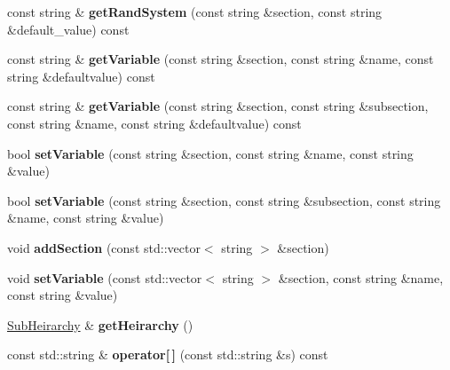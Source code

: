 \begin{DoxyCompactItemize}
\item 
const string \& {\bfseries get\+Rand\+System} (const string \&section, const string \&default\+\_\+value) const \hypertarget{classGalaxyXML_1_1SGalaxy_a46191adbdb5bd25e80ecada9996967a2}{}\label{classGalaxyXML_1_1SGalaxy_a46191adbdb5bd25e80ecada9996967a2}

\item 
const string \& {\bfseries get\+Variable} (const string \&section, const string \&name, const string \&defaultvalue) const \hypertarget{classGalaxyXML_1_1SGalaxy_a654c5e2c492b29ec14e2c91b8d5f7ea6}{}\label{classGalaxyXML_1_1SGalaxy_a654c5e2c492b29ec14e2c91b8d5f7ea6}

\item 
const string \& {\bfseries get\+Variable} (const string \&section, const string \&subsection, const string \&name, const string \&defaultvalue) const \hypertarget{classGalaxyXML_1_1SGalaxy_adbf884cb28a2acae56ecd340ddad8e51}{}\label{classGalaxyXML_1_1SGalaxy_adbf884cb28a2acae56ecd340ddad8e51}

\item 
bool {\bfseries set\+Variable} (const string \&section, const string \&name, const string \&value)\hypertarget{classGalaxyXML_1_1SGalaxy_a1f8b42597f2ae4363a9a4847ea8c7569}{}\label{classGalaxyXML_1_1SGalaxy_a1f8b42597f2ae4363a9a4847ea8c7569}

\item 
bool {\bfseries set\+Variable} (const string \&section, const string \&subsection, const string \&name, const string \&value)\hypertarget{classGalaxyXML_1_1SGalaxy_a9360392564b3f644747f8dc722ecf74a}{}\label{classGalaxyXML_1_1SGalaxy_a9360392564b3f644747f8dc722ecf74a}

\item 
void {\bfseries add\+Section} (const std\+::vector$<$ string $>$ \&section)\hypertarget{classGalaxyXML_1_1SGalaxy_a2c39436467d294d95bca1e70698bb2e7}{}\label{classGalaxyXML_1_1SGalaxy_a2c39436467d294d95bca1e70698bb2e7}

\item 
void {\bfseries set\+Variable} (const std\+::vector$<$ string $>$ \&section, const string \&name, const string \&value)\hypertarget{classGalaxyXML_1_1SGalaxy_ae00847c017232569775323f313443da9}{}\label{classGalaxyXML_1_1SGalaxy_ae00847c017232569775323f313443da9}

\item 
\hyperlink{classGalaxyXML_1_1SubHeirarchy}{Sub\+Heirarchy} \& {\bfseries get\+Heirarchy} ()\hypertarget{classGalaxyXML_1_1SGalaxy_a7ce6a5767fb6932fb4e3082b2f93b9a2}{}\label{classGalaxyXML_1_1SGalaxy_a7ce6a5767fb6932fb4e3082b2f93b9a2}

\item 
const std\+::string \& {\bfseries operator\mbox{[}$\,$\mbox{]}} (const std\+::string \&s) const \hypertarget{classGalaxyXML_1_1SGalaxy_a47bd0d3c4df4527d17dca2592d09af44}{}\label{classGalaxyXML_1_1SGalaxy_a47bd0d3c4df4527d17dca2592d09af44}

\end{DoxyCompactItemize}
